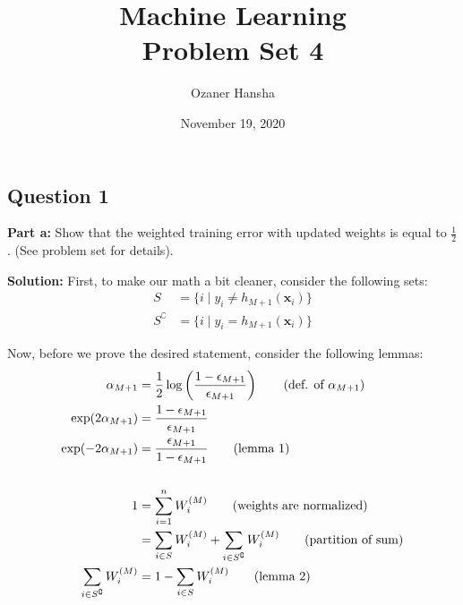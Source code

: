 \documentclass{article}
\renewcommand{\vec}[1]{\mathbf{#1}}
\begin{document}
\title{Machine Learning\\ Problem Set 4}
\author{Ozaner Hansha}
\date{November 19, 2020}
\maketitle

\subsection*{Question 1}
\noindent\textbf{Part a:} Show that the weighted training error with updated weights is equal to $\frac{1}{2}$. (See problem set for details).
\bigskip

\noindent\textbf{Solution:} First, to make our math a bit cleaner, consider the following sets:
\begin{align*}
  S&=\{i\mid y_i\not=h_{M+1}(\vec x_i)\}\\
  S^\complement&=\{i\mid y_i=h_{M+1}(\vec x_i)\}
\end{align*}

Now, before we prove the desired statement, consider the following lemmas:
\begin{align*}
  \alpha_{M+1}&=\frac{1}{2}\log\left(\frac{1-\epsilon_{M+1}}{\epsilon_{M+1}}\right)\tag{def. of $\alpha_{M+1}$}\\
  \exp(2\alpha_{M+1})&=\frac{1-\epsilon_{M+1}}{\epsilon_{M+1}}\\
  \exp(-2\alpha_{M+1})&=\frac{\epsilon_{M+1}}{1-\epsilon_{M+1}}\tag{lemma 1}\\
  \\
  1&=\sum_{i=1}^nW_i^{(M)}\tag{weights are normalized}\\
  &=\sum_{i\in S}W_i^{(M)}+\sum_{i\in S^\complement}W_i^{(M)}\tag{partition of sum}\\
  \sum_{i\in S^\complement}W_i^{(M)}&=1-\sum_{i\in S}W_i^{(M)}\tag{lemma 2}
\end{align*}
\end{document}
